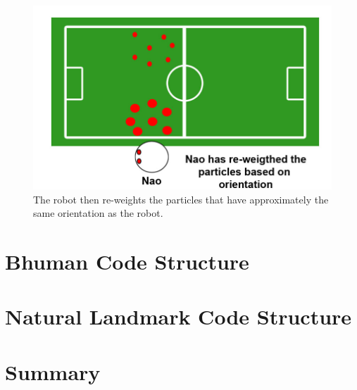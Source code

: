 \documentclass{report}
\begin{document}
\begin{figure}
\begin{minipage}[b]{0.5\linewidth}
\label{fig:turnedLeft}
\end{minipage}
\begin{minipage}[b]{0.5\linewidth}
\includegraphics[scale=0.2]{../Drawings/localisation/localisationAlgorithmReweight.jpg}
\caption{The robot then re-weights the particles that have approximately the same orientation as the robot.}
\label{fig:reweight}
\end{minipage}
\end{figure}


\section{Bhuman Code Structure}
\label{sec:codeStructure}

\section{Natural Landmark Code Structure}
\label{sec:naturalLandmarkCode}

\section{Summary}
\label{sec:summary4}
\end{document}
